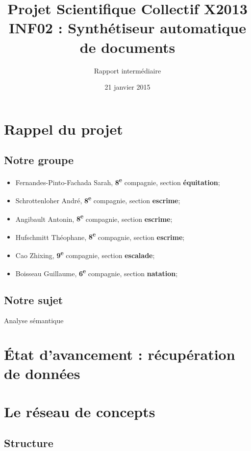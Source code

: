 \documentclass{article}           %
\title{Projet Scientifique Collectif X2013 \\INF02 : Synthétiseur automatique de documents}     %
\author{Rapport intermédiaire}
\date{21 janvier 2015}
\begin{document}

\maketitle  

\newpage

\tableofcontents			
\newpage

\section{Rappel du projet}

\subsection{Notre groupe}
\begin{itemize}
 \item Fernandes-Pinto-Fachada Sarah, \textbf{8\textsuperscript{e}} compagnie, section \textbf{\'equitation};
 \item Schrottenloher Andr\'e, \textbf{8\textsuperscript{e}} compagnie, section \textbf{escrime};
 \item Angibault Antonin, \textbf{8\textsuperscript{e}} compagnie, section \textbf{escrime};
 \item Hufschmitt Th\'eophane, \textbf{8\textsuperscript{e}} compagnie, section \textbf{escrime};
 \item Cao Zhixing, \textbf{9\textsuperscript{e}} compagnie, section \textbf{escalade};
 \item Boisseau Guillaume, \textbf{6\textsuperscript{e}} compagnie, section \textbf{natation};
\end{itemize}

\subsection{Notre sujet}
Analyse s\'emantique

\section{\'Etat d'avancement : r\'ecup\'eration de donn\'ees}

\section{Le r\'eseau de concepts}


\subsection{Structure}
\end{document}
